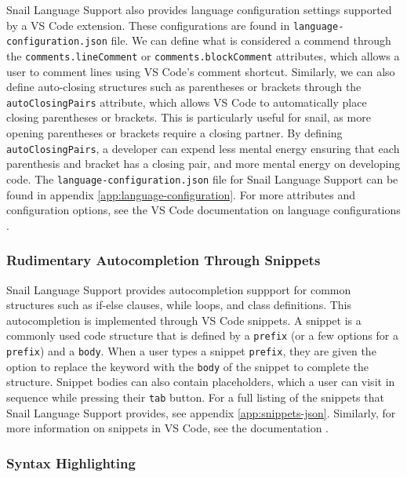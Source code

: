 \documentclass{article}
\begin{document}
Snail Language Support also provides language configuration settings supported by a VS Code extension. These configurations are found in \lstinline{language-configuration.json} file. We can define what is considered a commend through the \lstinline{comments.lineComment} or \lstinline{comments.blockComment} attributes, which allows a user to comment lines using VS Code's comment shortcut. Similarly, we can also define auto-closing structures such as parentheses or brackets through the \lstinline{autoClosingPairs} attribute, which allows VS Code to automatically place closing parentheses or brackets. This is particularly useful for snail, as more opening parentheses or brackets require a closing partner. By defining \lstinline{autoClosingPairs}, a developer can expend less mental energy ensuring that each parenthesis and bracket has a closing pair, and more mental energy on developing code. The \lstinline{language-configuration.json} file for Snail Language Support can be found in appendix \ref{app:language-configuration}. For more attributes and configuration options, see the VS Code documentation on language configurations \cite{Microsoft_2023f}.

\subsubsection{Rudimentary Autocompletion Through Snippets}

Snail Language Support provides autocompletion suppport for common structures such as if-else clauses, while loops, and class definitions. This autocompletion is implemented through VS Code snippets. A snippet is a commonly used code structure that is defined by a \lstinline{prefix} (or a few options for a \lstinline{prefix}) and a \lstinline{body}. When a user types a snippet \lstinline{prefix}, they are given the option to replace the keyword with the \lstinline{body} of the snippet to complete the structure. Snippet bodies can also contain placeholders, which a user can visit in sequence while pressing their \lstinline{tab} button. For a full listing of the snippets that Snail Language Support provides, see appendix \ref{app:snippets-json}. Similarly, for more information on snippets in VS Code, see the documentation \cite{Microsoft_2023g}.

\subsubsection{Syntax Highlighting}
\end{document}
